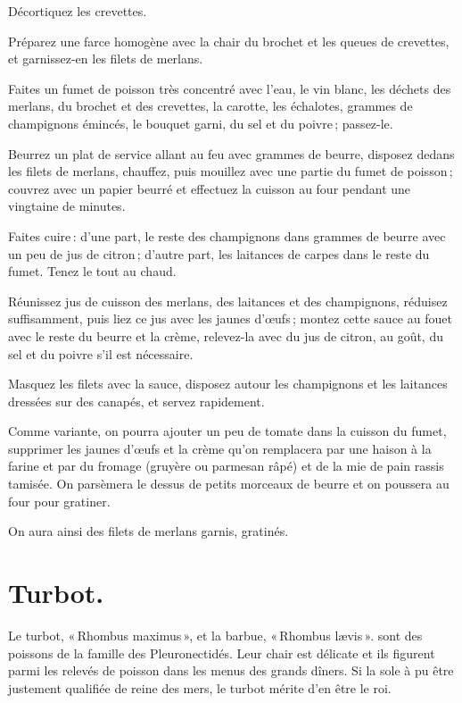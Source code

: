 Décortiquez les crevettes.

Préparez une farce homogène avec la chair du brochet et les queues de crevettes,
et garnissez-en les filets de merlans.

Faites un fumet de poisson très concentré avec l'eau, le vin blanc, les déchets
des merlans, du brochet et des crevettes, la carotte, les échalotes, {\mmm} grammes
de champignons émincés, le bouquet garni, du sel et du poivre ; passez-le.

Beurrez un plat de service allant au feu avec {\mmm} grammes de beurre, disposez
dedans les filets de merlans, chauffez, puis mouillez avec une partie du fumet de
poisson ; couvrez avec un papier beurré et effectuez la cuisson au four pendant
une vingtaine de minutes.

Faites cuire : d'une part, le reste des champignons dans {\mmm} grammes de beurre
avec un peu de jus de citron ; d'autre part, les laitances de carpes dans le reste du
fumet. Tenez le tout au chaud.

Réunissez jus de cuisson des merlans, des laitances et des champignons, réduisez
suffisamment, puis liez ce jus avec les jaunes d'œufs ; montez cette sauce au fouet
avec le reste du beurre et la crème, relevez-la avec du jus de citron, au goût, du sel
et du poivre s'il est nécessaire.

Masquez les filets avec la sauce, disposez autour les champignons et les laitances
dressées sur des canapés, et servez rapidement.

\sk

Comme variante, on pourra ajouter un peu de tomate dans la cuisson du fumet,
supprimer les jaunes d'œufs et la crème qu'on remplacera par une haison à la
farine et par du fromage (gruyère ou parmesan râpé) et de la mie de pain rassis
tamisée. On parsèmera le dessus de petits morceaux de beurre et on poussera au
four pour gratiner.

On aura ainsi des filets de merlans garnis, gratinés.

\section*{\centering Turbot.}

Le turbot, « Rhombus maximus », et la barbue, « Rhombus lævis ». sont des
poissons de la famille des Pleuronectidés. Leur chair est délicate et ils
figurent parmi les relevés de poisson dans les menus des grands dîners. Si la
sole à pu être justement qualifiée de reine des mers, le turbot mérite d'en
être le roi.

